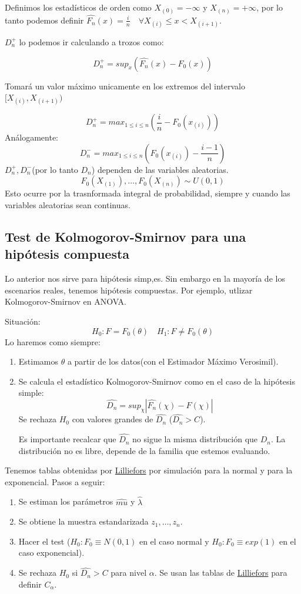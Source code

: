 Definimos los estadísticos de orden como $X_{(0)}=-\infty$ y $X_{(n)}=+\infty$, por lo tanto podemos definir $\widehat{F_n}(x)=\frac{i}{n} \quad \forall X_{(i)} \leq x < X_{(i+1)}$.

$D_n^+$ lo podemos ir calculando a trozos como:

\[
    D_n^+=sup_x(\widehat{F_n}(x)-F_0(x))
\]
    
Tomará un valor máximo unicamente en los extremos del intervalo $[X_{(i)},X_{(i+1)})$        
            
\[
    D_n^+=max_{1 \leq i \leq n}\left(\frac{i}{n}-F_0(x_{(i)})\right)
\]
Análogamente:
\[
    D_n^-=max_{1 \leq i \leq n}\left(F_0(x_{(i)})-\frac{i-1}{n}\right)
\]
$D_n^+,D_n^-$(por lo tanto $D_n$) dependen de las variables aleatorias.
\[
F_0(X_{(1)}),\dots,F_0(X_{(n)}) \sim U(0,1)
\]
Esto ocurre por la trasnformada integral de probabilidad, siempre y cuando las variables aleatorias sean continuas.

\subsection{Test de Kolmogorov-Smirnov para una hipótesis compuesta}

Lo anterior nos sirve para hipótesis simp,es. Sin embargo en la mayoría de los escenarios reales, tenemos hipótesis compuestas.
Por ejemplo, utlizar Kolmogorov-Smirnov en ANOVA.

Situación:
\[
H_0: F=F_0(\theta) \quad H_1:F \neq F_0(\theta)
\]
Lo haremos como siempre:
\begin{enumerate}
    \item Estimamos $\theta$ a partir de los datos(con el Estimador Máximo Verosimil).
    \item Se calcula el estadístico Kolmogorov-Smirnov como en el caso de la hipótesis simple:
    \[
    \widehat{D_n}=sup_\chi|\widehat{F_n}(\chi)-F(\chi)|
    \]
    Se rechaza $H_0$ con valores grandes de $\widehat{D_n}$ ($\widehat{D_n}>C$). 
    
    Es importante recalcar que $\widehat{D_n}$ no sigue la misma distribución que $D_n$.
    La distribución no es libre, depende de la familia que estemos evaluando.
\end{enumerate}

Tenemos tablas obtenidas por \href{https://es.wikipedia.org/wiki/Prueba_de_Lilliefors}{Lilliefors}
por simulación para la normal y para la exponencial.
Pasos a seguir:
\begin{enumerate}
    \item Se estiman los parámetros $\widehat{mu}$ y $\widehat{\lambda}$
    \item Se obtiene la muestra estandarizada $z_1,\dots,z_n$.
    \item Hacer el test ($H_0:F_0 \equiv N(0,1)$ en el caso normal y $H_0:F_0\equiv exp(1)$ en el caso exponencial).
    \item Se rechaza $H_0$ si $\widehat{D_n}>C$ para nivel $\alpha$. Se usan las tablas de \href{https://es.wikipedia.org/wiki/Prueba_de_Lilliefors}{Lilliefors}
    para definir $C_\alpha$.
\end{enumerate}

